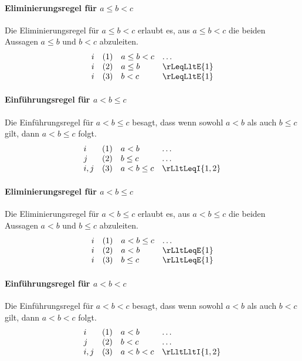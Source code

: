 \documentclass{book}
\theoremstyle{plain}
\theoremstyle{remark}
\theoremstyle{definition}
\begin{document}
\paragraph{Eliminierungsregel für \(a \leq b < c\)}
Die Eliminierungsregel für \(a \leq b < c\) erlaubt es, aus \(a \leq b < c\) die beiden Aussagen \(a \leq b\) und \(b < c\) abzuleiten.
\[
\begin{array}{llll}
    i & (1) & a \leq b < c & \dots \\
    i & (2) & a \leq b & \rLeqLltE{1} \\
    i & (3) & b < c & \rLeqLltE{1}
\end{array}
\]

\paragraph{Einführungsregel für \(a < b \leq c\)}
Die Einführungsregel für \(a < b \leq c\) besagt, dass wenn sowohl \(a < b\) als auch \(b \leq c\) gilt, dann \(a < b \leq c\) folgt.
\[
\begin{array}{llll}
    i   & (1) & a < b & \dots \\
    j   & (2) & b \leq c & \dots \\
    i,j & (3) & a < b \leq c & \rLltLeqI{1,2}
\end{array}
\]

\paragraph{Eliminierungsregel für \(a < b \leq c\)}
Die Eliminierungsregel für \(a < b \leq c\) erlaubt es, aus \(a < b \leq c\) die beiden Aussagen \(a < b\) und \(b \leq c\) abzuleiten.
\[
\begin{array}{llll}
    i & (1) & a < b \leq c & \dots \\
    i & (2) & a < b & \rLltLeqE{1} \\
    i & (3) & b \leq c & \rLltLeqE{1}
\end{array}
\]

\paragraph{Einführungsregel für \(a < b < c\)}
Die Einführungsregel für \(a < b < c\) besagt, dass wenn sowohl \(a < b\) als auch \(b < c\) gilt, dann \(a < b < c\) folgt.
\[
\begin{array}{llll}
    i   & (1) & a < b & \dots \\
    j   & (2) & b < c & \dots \\
    i,j & (3) & a < b < c & \rLltLltI{1,2}
\end{array}
\]
\end{document}
